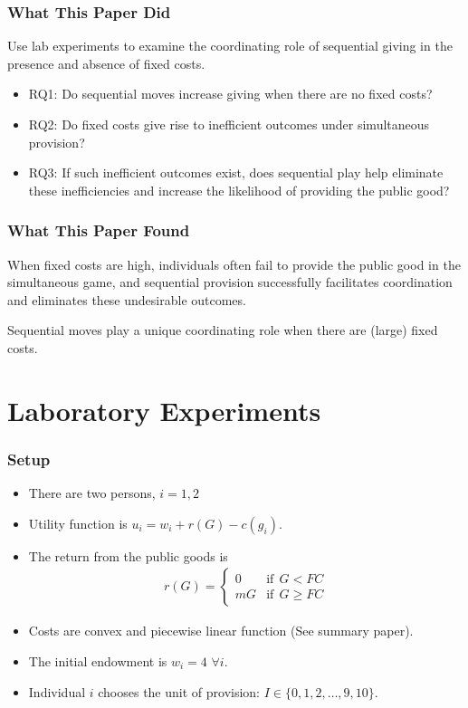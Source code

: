 \documentclass[unicode,12pt]{beamer}
\begin{document}
    \begin{frame}
        \frametitle{What This Paper Did}
    
        Use lab experiments to examine the coordinating role of sequential giving in the presence and absence of fixed costs.
        \begin{itemize}
            \item RQ1: Do sequential moves increase giving when there are no fixed costs?
            \item RQ2: Do fixed costs give rise to inefficient outcomes under simultaneous provision?
            \item RQ3: If such inefficient outcomes exist, does sequential play help eliminate these inefficiencies and increase the likelihood of providing the public good?
        \end{itemize}
    
    \end{frame}

    \begin{frame}
        \frametitle{What This Paper Found}
    
        When fixed costs are high, individuals often fail to provide the public good in the simultaneous game, and sequential provision successfully facilitates coordination and eliminates these undesirable outcomes.

        Sequential moves play a unique coordinating role when there are (large) fixed costs.
    
    \end{frame}

    \section{Laboratory Experiments}

    \begin{frame}
        \frametitle{Setup}
    
        \begin{itemize}
            \item There are two persons, $i = 1, 2$
            \item Utility function is $u_i = w_i + r(G) - c(g_i)$.
            \item The return from the public goods is 
            \begin{align*}
                r(G) =
                \begin{cases}
                    0   &\text{if}\:\: G < FC \\
                    mG  &\text{if}\:\: G \ge FC
                \end{cases}
            \end{align*}
            \item Costs are convex and piecewise linear function (See summary paper).
            \item The initial endowment is $w_i = 4$ $\forall i$.
            \item Individual $i$ chooses the unit of provision: $I \in \{0, 1, 2, \ldots, 9, 10\}$.
        \end{itemize}
    
    \end{frame}
\end{document}
